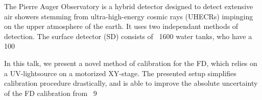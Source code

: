 \documentclass{scdpg}
\begin{document}
\begin{scAbstract}
\scNoUseTeX
{}
\scBeginText
The Pierre Auger Observatory is a hybrid detector designed to detect extensive air showers stemming from ultra-high-energy cosmic rays (UHECRs) impinging on the upper atmosphere of the earth. It uses two independant methods of detection. The surface detector (SD) consists of ~1600 water tanks, who have a 100%

In this talk, we present a novel method of calibration for the FD, which relies on a UV-lightsource on a motorized XY-stage. The presented setup simplifies calibration procedure drastically, and is able to improve the absolute uncertainty of the FD calibration from ~9%
\scEndText
{}
\end{scAbstract}
\end{document}
